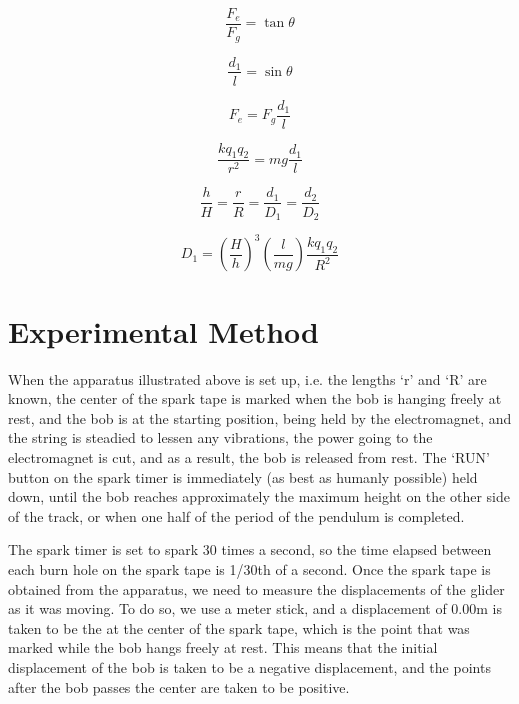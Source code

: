 \documentclass{article}
\begin{document}
  \begin{equation}
    \frac{F_e}{F_g} = \tan\theta
  \end{equation}

  \begin{equation}
    \frac{d_1}{l}=\sin\theta
  \end{equation}

  \begin{equation}
    F_e=F_g\frac{d_1}{l}
  \end{equation}

  \begin{equation}
    \frac{k q_1 q_2}{r^2}=mg\frac{d_1}{l}
  \end{equation}

  \begin{equation}
    \frac{h}{H}=\frac{r}{R}=\frac{d_1}{D_1}=\frac{d_2}{D_2}
  \end{equation}

  \begin{equation}
    D_1=(\frac{H}{h})^3 (\frac{l}{mg}) \frac{k q_1 q_2}{R^2}
  \end{equation}

\section{Experimental Method}
When the apparatus illustrated above is set up, i.e. the lengths ‘r’ and ‘R’ are known, the center of the spark tape is marked when the bob is hanging freely at rest, and the bob is at the starting position, being held by the electromagnet, and the string is steadied to lessen any vibrations, the power going to the electromagnet is cut, and as a result, the bob is released from rest. The ‘RUN’ button on the spark timer is immediately (as best as humanly possible) held down, until the bob reaches approximately the maximum height on the other side of the track, or when one half of the period of the pendulum is completed.

The spark timer is set to spark 30 times a second, so the time elapsed between each burn hole on the spark tape is 1/30th of a second. Once the spark tape is obtained from the apparatus, we need to measure the displacements of the glider as it was moving. To do so, we use a meter stick, and a displacement of 0.00m is taken to be the at the center of the spark tape, which is the point that was marked while the bob hangs freely at rest. This means that the initial displacement of the bob is taken to be a negative displacement, and the points after the bob passes the center are taken to be positive.
\end{document}
